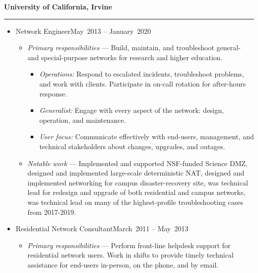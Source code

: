 \documentclass[10pt]{article}
\newenvironment{job}[5]
{
	\begin{leftcolumn*}
		\raggedleft{#3}
	\end{leftcolumn*}

	\begin{rightcolumn}
		\begin{itemize}[leftmargin=0em, itemindent=0em, labelsep=0.64em, topsep=0em, partopsep=0em]
			\item[\Large\textbullet]{#1}\hfill{}{#2}~{#3} -- {#4}~{#5}
			\begin{itemize}[leftmargin=1em, labelindent=\parindent]
}
{
			\end{itemize}
		\end{itemize}
	\end{rightcolumn}
}
\newenvironment{experience}
{
	\columnratio{0.05}
	\setlength{\columnsep}{2em}
	\setlength{\columnseprule}{0.4pt}
	\begin{paracol}{2}
}
{
	\end{paracol}
}
\newenvironment{employer}[1]
{
	\renewcommand{\employer}{{#1}}
	\begin{rightcolumn}
		\noindent\textbf{\employer}
		\smallskip
		{\color{lightgray}\hrule}
		\smallskip
	\end{rightcolumn}
}
{
	\let\employer\undefinedmacro
}
\begin{document}
\begin{experience}
	\begin{employer}{University of California, Irvine}
		\begin{job}{Network Engineer}{May}{2013}{January}{2020}
			\item[]\emph{Primary responsibilities} --- Build, maintain, and troubleshoot general- and special-purpose networks for research and higher education.
			\begin{itemize}
				\item\emph{Operations:} Respond to escalated incidents, troubleshoot problems, and work with clients. Participate in on-call rotation for after-hours response.
				\item\emph{Generalist:} Engage with every aspect of the network: design, operation, and maintenance.
				\item\emph{User focus:} Communicate effectively with end-users, management, and technical stakeholders about changes, upgrades, and outages.
			\end{itemize}
			\item[]\emph{Notable work} --- Implemented and supported NSF-funded Science DMZ, designed and implemented large-scale deterministic NAT, designed and implemented networking for campus disaster-recovery site, was technical lead for redesign and upgrade of both residential and campus networks, was technical lead on many of the highest-profile troubleshooting cases from 2017-2019.
		\end{job}
		\begin{job}{Residential Network Consultant}{March}{2011}{May}{2013}
			\item[]\emph{Primary responsibilities} --- Perform front-line helpdesk support for residential network users. Work in shifts to provide timely technical assistance for end-users in-person, on the phone, and by email.
		\end{job}
	\end{employer}
\end{experience}
\end{document}
